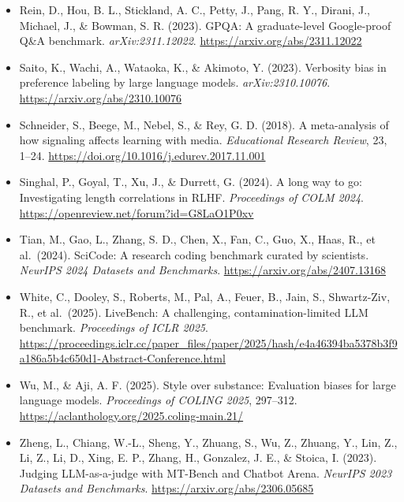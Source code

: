 \documentclass[
]{article}
\begin{document}
\begin{itemize}
  validation study of sophisticated approaches to lexical diversity
  assessment. \emph{Behavior Research Methods}, 42(2), 381--392.
  \url{https://doi.org/10.3758/BRM.42.2.381}
\item
  Rein, D., Hou, B. L., Stickland, A. C., Petty, J., Pang, R. Y.,
  Dirani, J., Michael, J., \& Bowman, S. R. (2023). GPQA: A
  graduate-level Google-proof Q\&A benchmark. \emph{arXiv:2311.12022}.
  \url{https://arxiv.org/abs/2311.12022}
\item
  Saito, K., Wachi, A., Wataoka, K., \& Akimoto, Y. (2023). Verbosity
  bias in preference labeling by large language models.
  \emph{arXiv:2310.10076}. \url{https://arxiv.org/abs/2310.10076}
\item
  Schneider, S., Beege, M., Nebel, S., \& Rey, G. D. (2018). A
  meta-analysis of how signaling affects learning with media.
  \emph{Educational Research Review}, 23, 1--24.
  \url{https://doi.org/10.1016/j.edurev.2017.11.001}
\item
  Singhal, P., Goyal, T., Xu, J., \& Durrett, G. (2024). A long way to
  go: Investigating length correlations in RLHF. \emph{Proceedings of
  COLM 2024}. \url{https://openreview.net/forum?id=G8LaO1P0xv}
\item
  Tian, M., Gao, L., Zhang, S. D., Chen, X., Fan, C., Guo, X., Haas, R.,
  et al.~(2024). SciCode: A research coding benchmark curated by
  scientists. \emph{NeurIPS 2024 Datasets and Benchmarks}.
  \url{https://arxiv.org/abs/2407.13168}
\item
  White, C., Dooley, S., Roberts, M., Pal, A., Feuer, B., Jain, S.,
  Shwartz-Ziv, R., et al.~(2025). LiveBench: A challenging,
  contamination-limited LLM benchmark. \emph{Proceedings of ICLR 2025}.
  \url{https://proceedings.iclr.cc/paper_files/paper/2025/hash/e4a46394ba5378b3f9a186a5b4c650d1-Abstract-Conference.html}
\item
  Wu, M., \& Aji, A. F. (2025). Style over substance: Evaluation biases
  for large language models. \emph{Proceedings of COLING 2025},
  297--312. \url{https://aclanthology.org/2025.coling-main.21/}
\item
  Zheng, L., Chiang, W.-L., Sheng, Y., Zhuang, S., Wu, Z., Zhuang, Y.,
  Lin, Z., Li, Z., Li, D., Xing, E. P., Zhang, H., Gonzalez, J. E., \&
  Stoica, I. (2023). Judging LLM-as-a-judge with MT-Bench and Chatbot
  Arena. \emph{NeurIPS 2023 Datasets and Benchmarks}.
  \url{https://arxiv.org/abs/2306.05685}
\end{itemize}

\endgroup
\end{document}

